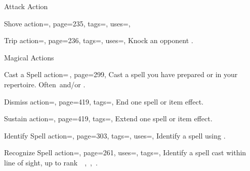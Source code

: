 \begin{PageBack}
\begin{Tables}{\backTableHeight}
\begin{Table}{Attack Action}
\begin{entry}{Shove}{%
                action=,
                page=235,
                tags=\Attack,
                uses=\AthleticsFortitude,
            }
            \end{entry}
            \begin{entry}{Trip}{%
                action=,
                page=236,
                tags=\Attack,
                uses=\AthleticsReflex,
            }
                Knock an opponent \Prone.\hfill
                \quad{}
            \end{entry}
        \end{Table}
        \TableSpace
        \begin{Table}{Magical Actions}
            \begin{entry}{Cast a Spell}{%
                action={\,\sffamily{}},
                page=299,
            }
                Cast a spell you have prepared or in your repertoire. Often \Manipulate\,and/or \Concentrate.\hfill
            \end{entry}
            \begin{entry}{Dismiss}{%
                action=,
                page=419,
                tags=\Concentrate,
            }
                End one spell or item effect.
            \end{entry}
            \begin{entry}{Sustain}{%
                action=,
                page=419,
                tags=\Concentrate,
            }
                Extend one spell or item effect.\hfill
            \end{entry}
            \begin{entry}{Identify Spell}{%
                action=,
                page=303,
                tags=\Concentrate,
                uses={\MagicalSkill[tags={S}]},
            }
                Identify a spell using .
            \end{entry}
            \begin{entry}{Recognize Spell}{%
                action=,
                page=261,
                uses={\MagicalSkill[tags={T,S}]\Feat},
                tags=\Concentrate,
            }
                Identify a spell cast within line of sight, up to rank \Ts\, \E\,, \M\,, \Le\,.

\end{entry}
\end{Table}
\end{Tables}
\end{PageBack}
